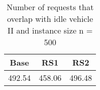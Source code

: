 \begin{table}[H]
\centering
\begin{tabular}{ccc}
  \hline
  \textbf{Base} & \textbf{RS1} & \textbf{RS2} \\\hline
  492.54 & 458.06 & 496.48 \\\hline
\end{tabular}
\caption{Number of requests that overlap with idle vehicle II and instance size n = 500}
\label{tab:wait:resrelocation-number-request-overlap-comparison_II_500}
\end{table}
